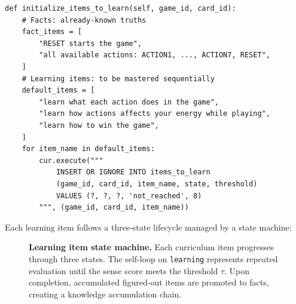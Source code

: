 \documentclass[11pt,letterpaper]{article}
\begin{document}
\begin{lstlisting}[caption={Curriculum initialization.},label=lst:curriculum]
def initialize_items_to_learn(self, game_id, card_id):
    # Facts: already-known truths
    fact_items = [
        "RESET starts the game",
        "all available actions: ACTION1, ..., ACTION7, RESET",
    ]
    # Learning items: to be mastered sequentially
    default_items = [
        "learn what each action does in the game",
        "learn how actions affects your energy while playing",
        "learn how to win the game",
    ]
    for item_name in default_items:
        cur.execute("""
            INSERT OR IGNORE INTO items_to_learn
            (game_id, card_id, item_name, state, threshold)
            VALUES (?, ?, ?, 'not_reached', 8)
        """, (game_id, card_id, item_name))
\end{lstlisting}

Each learning item follows a three-state lifecycle managed by a state machine:

\begin{figure}[t]
  \centering
  \caption{\textbf{Learning item state machine.} Each curriculum item progresses through three states. The self-loop on \texttt{learning} represents repeated evaluation until the sense score meets the threshold $\tau$. Upon completion, accumulated figured-out items are promoted to facts, creating a knowledge accumulation chain.}
  \label{fig:state_machine}
\end{figure}
\end{document}
